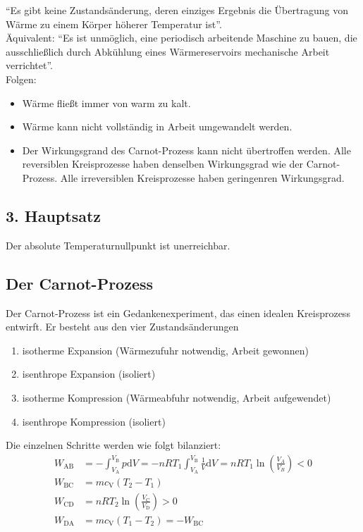 \documentclass[a4paper]{scrartcl}
\begin{document}
"`Es gibt keine Zustandsänderung, deren einziges Ergebnis die Übertragung von Wärme zu einem Körper höherer Temperatur ist"'.\\
Äquivalent: "`Es ist unmöglich, eine periodisch arbeitende Maschine zu bauen, die ausschließlich durch Abkühlung eines Wärmereservoirs mechanische Arbeit verrichtet"'.\\

Folgen:
\begin{itemize}[noitemsep]
  \item Wärme fließt immer von warm zu kalt.
  \item Wärme kann nicht vollständig in Arbeit umgewandelt werden.
  \item Der Wirkungsgrand des Carnot-Prozess kann nicht übertroffen werden. Alle reversiblen Kreisprozesse haben denselben Wirkungsgrad wie der Carnot-Prozess. Alle irreversiblen Kreisprozesse haben geringenren Wirkungsgrad.
\end{itemize}


\subsection{3. Hauptsatz}

Der absolute Temperaturnullpunkt ist unerreichbar.

\subsection{Der Carnot-Prozess}
Der Carnot-Prozess ist ein Gedankenexperiment, das einen idealen Kreisprozess entwirft. Er besteht aus den vier Zustandsänderungen
\begin{enumerate}[noitemsep]
  \item isotherme Expansion (Wärmezufuhr notwendig, Arbeit gewonnen)
  \item isenthrope Expansion (isoliert)
  \item isotherme Kompression (Wärmeabfuhr notwendig, Arbeit aufgewendet)
  \item isenthrope Kompression (isoliert)
\end{enumerate}

Die einzelnen Schritte werden wie folgt bilanziert:
\begin{align*}
  W_\text{AB} & = - \int_{V_\text{A}}^{V_\text{B}}p\text{d}V = - nRT_1 \int_{V_\text{A}}^{V_\text{B}} \frac{1}{V}\text{d}V = nRT_1 \ln\left( \frac{V_A}{V_B} \right)  < 0 \\
  W_\text{BC} & = mc_\text{V}(T_2-T_1) \\
  W_\text{CD} & = nRT_2\ln\left( \frac{V_\text{C}}{V_\text{D}} \right)  > 0\\
  W_\text{DA} & = mc_\text{V}(T_1-T_2) = - W_\text{BC}
\end{align*}
\end{document}
